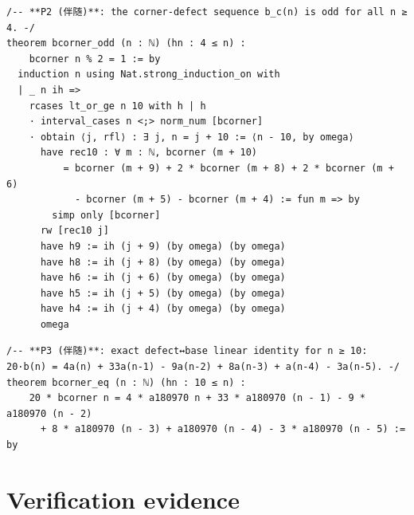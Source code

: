 \documentclass[11pt]{article}
\begin{document}
\begin{lstlisting}[caption={Complete proof of Theorem~\ref{thm:p2} (verbatim excerpt, lines 86--104 of \texttt{final/01-proof-complete.lean}).},label={lst:p2}]
/-- **P2 (伴随)**: the corner-defect sequence b_c(n) is odd for all n ≥ 4. -/
theorem bcorner_odd (n : ℕ) (hn : 4 ≤ n) :
    bcorner n % 2 = 1 := by
  induction n using Nat.strong_induction_on with
  | _ n ih =>
    rcases lt_or_ge n 10 with h | h
    · interval_cases n <;> norm_num [bcorner]
    · obtain ⟨j, rfl⟩ : ∃ j, n = j + 10 := ⟨n - 10, by omega⟩
      have rec10 : ∀ m : ℕ, bcorner (m + 10)
          = bcorner (m + 9) + 2 * bcorner (m + 8) + 2 * bcorner (m + 6)
            - bcorner (m + 5) - bcorner (m + 4) := fun m => by
        simp only [bcorner]
      rw [rec10 j]
      have h9 := ih (j + 9) (by omega) (by omega)
      have h8 := ih (j + 8) (by omega) (by omega)
      have h6 := ih (j + 6) (by omega) (by omega)
      have h5 := ih (j + 5) (by omega) (by omega)
      have h4 := ih (j + 4) (by omega) (by omega)
      omega
\end{lstlisting}

\begin{lstlisting}[caption={Formal statement of Theorem~\ref{thm:p3} (verbatim excerpt, lines 106--110 of \texttt{final/01-proof-complete.lean}); proof (97 lines) in artifact package \texttt{proofs/}.},label={lst:p3}]
/-- **P3 (伴随)**: exact defect↔base linear identity for n ≥ 10:
20·b(n) = 4a(n) + 33a(n-1) - 9a(n-2) + 8a(n-3) + a(n-4) - 3a(n-5). -/
theorem bcorner_eq (n : ℕ) (hn : 10 ≤ n) :
    20 * bcorner n = 4 * a180970 n + 33 * a180970 (n - 1) - 9 * a180970 (n - 2)
      + 8 * a180970 (n - 3) + a180970 (n - 4) - 3 * a180970 (n - 5) := by
\end{lstlisting}

\section{Verification evidence}
\end{document}
